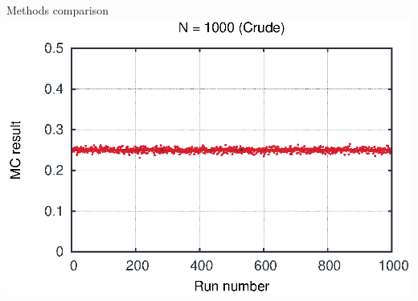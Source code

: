 \begin{emptyslide}{Methods comparison}
{    \includegraphics[width=\columnwidth]{figures/int21000.eps}
  }

\vfill\null
\end{emptyslide}

